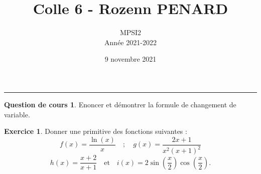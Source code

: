 \documentclass[a4paper, 11pt,openany]{article}%
\title{Colle 6 - Rozenn PENARD}
\author{MPSI2\\
Année 2021-2022}
\date{9 novembre 2021}
\theoremstyle{plain}
\theoremstyle{definition}
\newtheorem{cours}{Question de cours}
\newtheorem{exo}{Exercice}
\theoremstyle{remark}
\begin{document}
   \maketitle
      \rule{\linewidth}{0.5mm}


\begin{cours}
Enoncer et démontrer la formule de changement de variable.
\end{cours}


\begin{exo}
Donner une primitive des fonctions suivantes :
\[ f(x) = \frac{\ln(x)}{x} \quad ; \quad  g(x) = \frac{2x + 1}{x^2(x + 1)^2}\]
\[ h(x) = \frac{x+2}{x+1} \quad \text{et} \quad i(x) = 2 \sin \left( \frac{x}{2} \right) \cos \left( \frac{x}{2} \right).\]
\end{exo}
\end{document}
